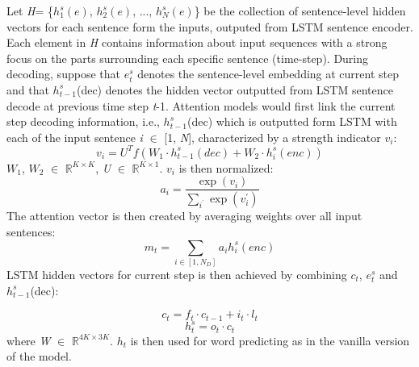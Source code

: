 \documentclass[letterpaper]{article}
\begin{document}
Let \textit{H}= \{$h_{1}^{s}(e)$, $h_{2}^{s}(e)$, ..., $h_{N}^{s}(e)$\} be the collection of sentence-level hidden vectors for each sentence form the inputs, outputed from LSTM sentence encoder. Each element in \textit{H} contains information about input sequences with a strong focus on the parts surrounding each specific sentence (time-step). During decoding, suppose that \textit{$e_{t}^{s}$} denotes the sentence-level embedding at current step and that \textit{$h_{t-1}^{s}$}(dec) denotes the hidden vector outputted from LSTM sentence decode at previous time step \textit{t}-1. Attention models would first link the current step decoding information, i.e., \textit{$h_{t-1}^{s}$}(dec) which is outputted form LSTM with each of the input sentence \textit{i} $\in$ [1, \textit{N}], characterized by a strength indicator \textit{$v_{i}$}:
\begin{equation}\label{key}
v_{i} = U^{T}f(W_{1} \cdot h_{t-1}^{s}(dec) + W_{2} \cdot h_{i}^{s}(enc))
\end{equation}
\textit{$W_{1}$}, \textit{$W_{2}$} $\in$ $\mathbb{R}^{K \times K}$, \textit{U} $\in$ $\mathbb{R}^{K \times 1}$. \textit{$v_{i}$} is then normalized:
\begin{equation}\label{key}
a_{i}=\frac{\exp(v_{i})}{\sum_{i^{'}}\exp(v_{i}^{'})}
\end{equation}
The attention vector is then created by averaging weights over all input sentences:
\begin{equation}\label{key}
m_{t}=\sum_{i \in [1, N_{D}]}a_{i}h_{i}^{s}(enc)
\end{equation}
LSTM hidden vectors for current step is then achieved by combining \textit{$c_{t}$}, \textit{$e_{t}^{s}$} and \textit{$h_{t-1}^{s}$}(dec):

\begin{equation}\label{key}
c_{t} = f_{t} \cdot c_{t-1} + i_{t} \cdot l_{t}
\end{equation}
\begin{equation}\label{key}
h_{t}^{s} = o_{t} \cdot c_{t}
\end{equation}
where \textit{W} $\in$ $\mathbb{R}^{4K \times 3K}$. \textit{$h_{t}$} is then used for word predicting as in the vanilla version of the model.
\end{document}
